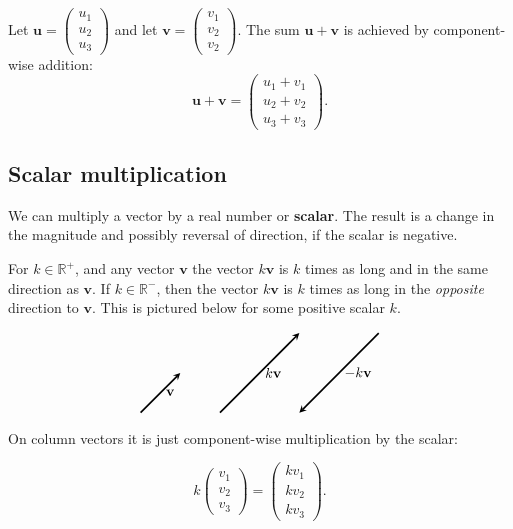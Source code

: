 \documentclass[a4paper,12pt]{amsart}
\begin{document}
    Let $\mathbf{u} = \begin{pmatrix} u_1 \\ u_2 \\ u_3 \end{pmatrix}$ and let $\mathbf{v} = \begin{pmatrix} v_1 \\ v_2 \\ v_2 \end{pmatrix}$. The sum $\mathbf{u} + \mathbf{v}$ is achieved by component-wise addition:
    \[ \mathbf{u} + \mathbf{v} = \begin{pmatrix} u_1 + v_1 \\ u_2 + v_2 \\ u_3 + v_3 \end{pmatrix}. \]

    \subsection{Scalar multiplication}

    We can multiply a vector by a real number or \textbf{scalar}. The result is a change in the magnitude and possibly reversal of direction, if the scalar is negative. 
    
    For $k \in \mathbb{R}^+$, and any vector $\mathbf{v}$ the vector $k \mathbf{v}$ is $k$ times as long and in the same direction as $\mathbf{v}$. If $k \in \mathbb{R}^-$, then the vector $k \mathbf{v}$ is $k$ times as long in the \emph{opposite} direction to $\mathbf{v}$. This is pictured below for some positive scalar $k$.

    \[
        \begin{tikzpicture}[vector/.style={-stealth,very thick}]
            \coordinate (A) at (0,0);
            \coordinate (B) at (1,1);
            \coordinate (C) at (2,0);
            \coordinate (D) at (4,2);
            \coordinate (E) at (4,0);
            \coordinate (F) at (6,2);
            \draw[vector] (A) -- (B) node[midway, right] {$\mathbf{v}$};
            \draw[vector] (C) -- (D) node[midway, right] {$k \mathbf{v}$};
            \draw[vector] (F) -- (E) node[midway, right] {$-k \mathbf{v}$};
        \end{tikzpicture}
    \]

    On column vectors it is just component-wise multiplication by the scalar:

    \[ k \begin{pmatrix} v_1 \\ v_2 \\ v_3 \end{pmatrix} = \begin{pmatrix} k v_1 \\ k v_2 \\ k v_3 \end{pmatrix}. \]
\end{document}
